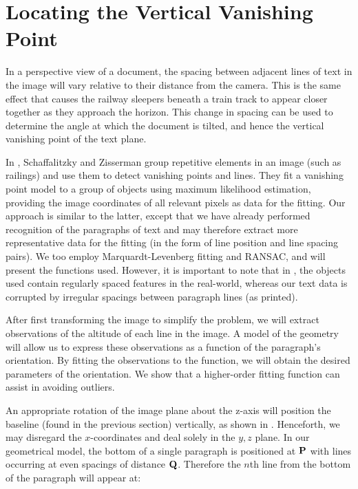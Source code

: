 
\section{Locating the Vertical Vanishing Point} \label{sec-vertvanish}


In a perspective view of a document, the spacing between adjacent lines of text
in the image will vary relative to their distance from the camera.  This is the
same effect that causes the railway sleepers beneath a train track to appear
closer together as they approach the horizon. This change in spacing can be used
to determine the angle at which the document is tilted, and hence the vertical
vanishing point  of the text plane.

In \cite{planargrouping}, Schaffalitzky and Zisserman group repetitive elements
in an image (such as railings) and use them to detect vanishing points and lines.
They fit a vanishing point model to a group of objects using maximum likelihood
estimation, providing the image coordinates of all relevant pixels as data for
the fitting. Our approach is similar to the latter, except that we have already
performed recognition 
of the paragraphs of text and may therefore extract more representative data for the fitting
(in the form of line position and line spacing pairs).
We too employ
Marquardt-Levenberg fitting
and RANSAC, and will present the functions used. However, it is important to
note that in \cite{planargrouping}, the objects used contain regularly spaced
features in the real-world, whereas our text data is corrupted by irregular
spacings between paragraph lines (as printed).


After first transforming the image to simplify the problem, we will extract observations of the altitude of each line in the image.  A model of the geometry will allow us to express these observations as a function of the paragraph's orientation.  By fitting the observations to the function, we will obtain the desired parameters of the orientation.  We show that a higher-order fitting function can assist in avoiding outliers.

An appropriate rotation of the image plane about the z-axis will position the
baseline (found in the previous section) vertically, as shown in
.  Henceforth, we may disregard the $x$-coordinates and deal
solely in the $y,z$ plane. 
In our geometrical model, the bottom of a single paragraph is positioned at ${ \bf P }$ with lines occurring at even spacings of distance ${ \bf Q }$.  Therefore the $n$th line from the bottom of the paragraph will appear at:

